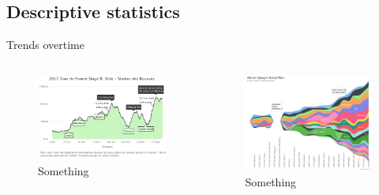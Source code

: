\documentclass[xcolor=table]{beamer}
\begin{document}
\subsection{Descriptive statistics}
\begin{frame}{Trends overtime}
    \begin{columns}
        \begin{column}{0.48\textwidth}
        \begin{figure}
        \includegraphics[scale=0.14]{image4.png}
        \caption{Something}
        \end{figure}
        \end{column}
        \begin{column}{0.48\textwidth}
        \begin{figure}
        \includegraphics[scale=0.094]{image5.png}
        \caption{Something}
        \end{figure}
        \end{column}
        \end{columns}

\end{frame}
\end{document}
